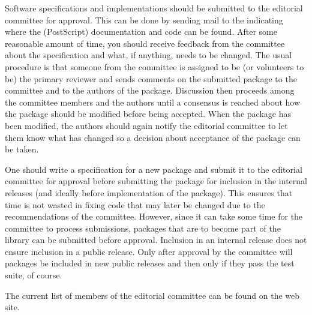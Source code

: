 Software specifications and implementations should be submitted to the
editorial committee for approval.  This can be done by sending mail to
the 
 indicating
where the (PostScript) documentation and code can be found.  After
some reasonable amount of time, you should receive feedback from
the committee about the specification and what, if anything, needs to
be changed. The usual procedure is that someone from the committee is
assigned to be (or volunteers to be) the primary reviewer and sends
comments on the submitted package to the committee and to the authors of
the package.  Discussion then proceeds among the committee members and the
authors until a consensus is reached about how the package should be
modified before being accepted.  When the package has been modified,
the authors should again notify the editorial committee to let them
know what has changed so a decision about acceptance of the package
can be taken.


One should write a specification for a new package
and submit it to the editorial committee for
approval before submitting the package for inclusion in the internal
releases (and ideally before implementation of the package).  This
ensures that time is not wasted in fixing code that may later be changed
due to the recommendations of the committee.
However, since it can take some time for the committee to process
submissions, packages that are to become part of the library
can be submitted
 before approval.
Inclusion in an internal release does not ensure inclusion in a public
release.  Only after approval by the committee will packages be included in new
public releases and then only if they pass the test suite, of course.

The current list of members of the editorial committee can be found on the web site.

